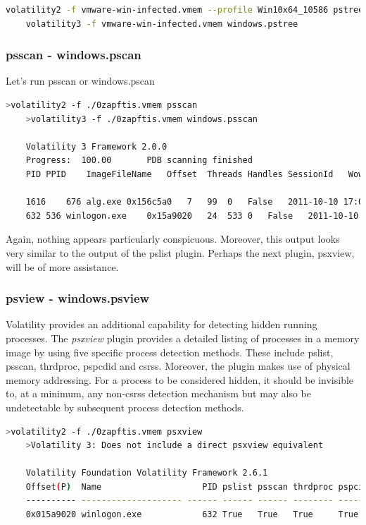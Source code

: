 \begin{lstlisting}[language=bash]
    volatility2 -f vmware-win-infected.vmem --profile Win10x64_10586 pstree
    volatility3 -f vmware-win-infected.vmem windows.pstree
\end{lstlisting}

\subsubsection{psscan - windows.pscan}
Let's run psscan or windows.pscan

\begin{lstlisting}[language=bash]
    >volatility2 -f ./0zapftis.vmem psscan
    >volatility3 -f ./0zapftis.vmem windows.psscan

    Volatility 3 Framework 2.0.0
    Progress:  100.00		PDB scanning finished
    PID	PPID	ImageFileName	Offset	Threads	Handles	SessionId	Wow64	CreateTime	ExitTime	File output

    1616	676	alg.exe	0x156c5a0	7	99	0	False	2011-10-10 17:04:01.000000 	N/A	Disabled
    632	536	winlogon.exe	0x15a9020	24	533	0	False	2011-10-10 17:03:58.000000 	N/A	Disabled
\end{lstlisting}

Again, nothing appears particularly conspicuous. Moreover, this output looks very similar to the output of the pslist plugin. Perhaps the next plugin, psxview, will be of more assistance.

\subsubsection{psview - windows.psview}
Volatility provides an additional capability for detecting hidden running processes. The \textit{psxview} plugin provides a detailed listing of processes in a memory image by using five specific process detection methods. These include pslist, psscan, thrdproc, pspcdid and csrss. Moreover, the plugin makes use of physical memory addressing. For a process to be considered hidden, it should be invisible to, at a minimum, any non-csrss detection mechanism but may also be undetectable by subsequent process detection methods.

\begin{lstlisting}[language=bash]
    >volatility2 -f ./0zapftis.vmem psxview
    >Volatility 3: Does not include a direct psxview equivalent

    Volatility Foundation Volatility Framework 2.6.1
    Offset(P)  Name                    PID pslist psscan thrdproc pspcid csrss session deskthrd ExitTime
    ---------- -------------------- ------ ------ ------ -------- ------ ----- ------- -------- --------
    0x015a9020 winlogon.exe            632 True   True   True     True   True  True    True
\end{lstlisting}

